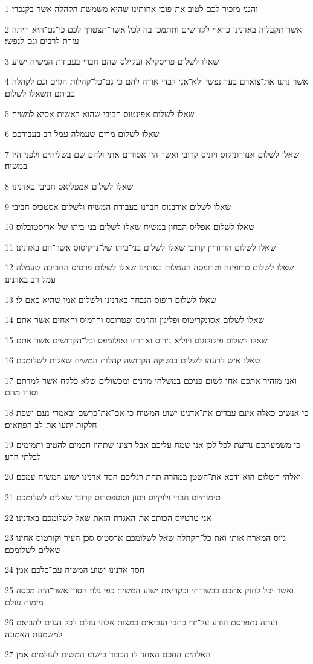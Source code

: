 \par 1 והנני מזכיר לכם לטוב את־פובי אחותינו שהיא משמשת הקהלה אשר בקנכרי׃
\par 2 אשר תקבלוה באדנינו כראוי לקדושים ותתמכו בה לכל אשר־תצטרך לכם כי־גם־היא היתה עזרת לרבים וגם לנפשי׃
\par 3 שאלו לשלום פריסקלא ועקילס שהם חברי בעבודת המשיח ישוע׃
\par 4 אשר נתנו את־צוארם בעד נפשי ולא־אני לבדי אודה להם כי גם־כל־קהלות הגוים וגם לקהלה בביתם תשאלו לשלום׃
\par 5 שאלו לשלום אפינטוס חביבי שהוא ראשית אסיא למשיח׃
\par 6 שאלו לשלום מרים שעמלה עמל רב בעבורכם׃
\par 7 שאלו לשלום אנדרוניקוס ויוניס קרובי ואשר היו אסורים אתי ולהם שם בשליחים ולפני היו במשיח׃
\par 8 שאלו לשלום אמפליאס חביבי באדנינו׃
\par 9 שאלו לשלום אורבנוס חברנו בעבודת המשיח ולשלום אסטכיס חביבי׃
\par 10 שאלו לשלום אפליס הבחון במשיח שאלו לשלום בני־ביתו של־אריסטובלוס׃
\par 11 שאלו לשלום הורודיון קרובי שאלו לשלום בני־ביתו של־נרקיסוס אשר־הם באדנינו׃
\par 12 שאלו לשלום טרופינה וטרופסה העמלות באדנינו שאלו לשלום פרסיס החביבה שעמלה עמל רב באדנינו׃
\par 13 שאלו לשלום רופוס הנבחר באדנינו ולשלום אמו שהיא כאם לי׃
\par 14 שאלו לשלום אסונקריטוס ופליגון והרמס ופטרובס והרמיס והאחים אשר אתם׃
\par 15 שאלו לשלום פילולוגוס ויוליא נירוס ואחותו ואולומפס וכל־הקדושים אשר אתם׃
\par 16 שאלו איש לרעהו לשלום בנשיקה הקדושה קהלות המשיח שאלות לשלומכם׃
\par 17 ואני מזהיר אתכם אחי לשום פניכם במשלחי מדנים ומכשולים שלא כלקח אשר למדתם וסורו מהם׃
\par 18 כי אנשים כאלה אינם עבדים את־אדנינו ישוע המשיח כי אם־את־כרשם ובאמרי נעם ושפת חלקות יתעו את־לב הפתאים׃
\par 19 כי משמעתכם נודעת לכל לכן אני שמח עליכם אבל רצוני שתהיו חכמים להטיב ותמימים לבלתי הרע׃
\par 20 ואלהי השלום הוא ידכא את־השטן במהרה תחת רגליכם חסד אדנינו ישוע המשיח עמכם׃
\par 21 טימותיוס חברי ולוקיוס ויסון וסוספטרוס קרובי שאלים לשלומכם׃
\par 22 אני טרטיוס הכותב את־האגרת הזאת שאל לשלומכם באדנינו׃
\par 23 גיוס המארח אותי ואת כל־הקהלה שאל לשלומכם ארסטוס סכן העיר וקורטוס אחינו שאלים לשלומכם׃
\par 24 חסד אדנינו ישוע המשיח עם־כלכם אמן׃
\par 25 ואשר יכל לחזק אתכם כבשורתי וכקריאת ישוע המשיח כפי גלוי הסוד אשר־היה מכסה מימות עולם׃
\par 26 ועתה נתפרסם ונודע על־ידי כתבי הנביאים כמצות אלהי עולם לכל הגוים להביאם למשמעת האמונה׃
\par 27 האלהים החכם האחד לו הכבוד בישוע המשיח לעולמים אמן׃


